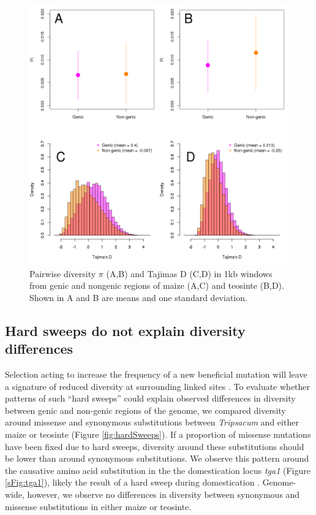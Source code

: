 \documentclass{pnastwo}
\begin{document}
\begin{article}
\begin{figure}
\begin{center}
  \includegraphics[width=.4\textwidth] {FigsAndFiles/Pi_and_Tajima.png}
\end{center}
\caption{Pairwise diversity $\pi$ (A,B) and Tajimas D (C,D) in 1kb windows from genic and nongenic regions of maize (A,C) and teosinte (B,D). Shown in A and B are means and one standard deviation.   \label{fig:diversity} }
\end{figure}

\subsection{Hard sweeps do not explain diversity differences}
Selection acting to increase the frequency of a new beneficial mutation will leave a signature of reduced diversity at surrounding linked sites \cite{smith1974}.
To evaluate whether patterns of such ``hard sweeps'' could explain observed differences in diversity between genic and non-genic regions of the genome, we compared diversity around missense and synonymous substitutions between \emph{Tripsacum} and either maize or teosinte (Figure
\ref{fig:hardSweeps}).
If a proportion of missense mutations have been fixed due to hard sweeps, diversity around these substitutions should be lower than around synonymous substitutions. 
We observe this pattern around the causative amino acid substitution in the the domestication locus \emph{tga1} (Figure \ref{sFig:tga1}), likely the result of a hard sweep during domestication \cite{wang2005origin, wang2015}.
Genome-wide, however, we observe no differences in diversity between synonymous and missense substitutions in either maize or teosinte.


\end{article}
\end{document}
